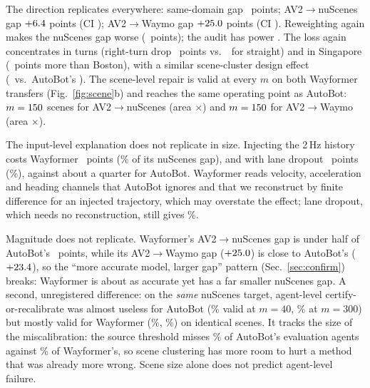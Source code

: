 The direction replicates everywhere: same-domain gap \gapSameWayformer\ points; AV2$\to$nuScenes gap
$+6.4$ points (CI \gapRawWayformerCI); AV2$\to$Waymo gap $+25.0$ points (CI \wmGapWfCI). Reweighting
again makes the nuScenes gap worse (\rewWayformer\ points); the audit has power \auditPowerWayformer. The loss again
concentrates in turns (right-turn drop \dropRightWf\ points vs.\
\dropStraightWf\ for straight) and in Singapore (\sgExtraRightWf\ points more than Boston), with a similar scene-cluster
design effect (\designEffWf\ vs.\ AutoBot's \designEffConf). The scene-level repair is valid at every $m$ on both
Wayformer transfers (Fig.~\ref{fig:scene}b) and reaches the same operating point as AutoBot: $m=150$ scenes for
AV2$\to$nuScenes (area \recAreaWfNs$\times$) and $m=150$ for AV2$\to$Waymo (area \recAreaWfWm$\times$).

The input-level explanation does not replicate in size. Injecting the 2\,Hz history costs Wayformer \wfInjHz\ points
(\wfInjHzFrac\% of its nuScenes gap), and with lane dropout \wfInjBoth\ points (\wfInjBothFrac\%), against about a quarter
for AutoBot. Wayformer reads velocity, acceleration and heading channels that AutoBot ignores and that we reconstruct by finite
difference for an injected trajectory, which may overstate the effect; lane dropout, which needs no reconstruction, still gives
\wfInjMapFrac\%.

Magnitude does not replicate. Wayformer's AV2$\to$nuScenes gap is under half of AutoBot's \gapRawConf\ points, while its
AV2$\to$Waymo gap ($+25.0$) is close to AutoBot's ($+23.4$), so the ``more accurate model, larger gap'' pattern
(Sec.~\ref{sec:confirm}) breaks: Wayformer is about as accurate yet has a far smaller nuScenes gap. A second, unregistered
difference: on the \emph{same} nuScenes target, agent-level certify-or-recalibrate was almost useless for AutoBot
(\agentCorNsForty\% valid at $m=40$, \agentCorNsThreeHundred\% at $m=300$) but mostly valid for Wayformer
(\agentCorWfForty\%, \agentCorWfThreeHundred\%) on identical scenes. It tracks the size of the miscalibration: the source
threshold misses \rSrcAutobot\% of AutoBot's evaluation agents against \rSrcWayformer\% of Wayformer's, so scene clustering has
more room to hurt a method that was already more wrong. Scene size alone does not predict agent-level failure.
